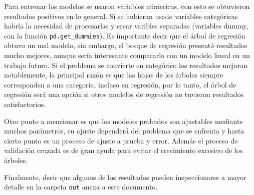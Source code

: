 \documentclass[11pt]{article}
\begin{document}
Para entrenar los modelos se usaron variables númericas, con esto se
obtuvieron resultados positivos en lo general. Si se hubieran usado
variables categóricas habría la necesidad de procesarlas y crear
varibles separadas (variables dummy, con la función
\texttt{pd.get\_dummies}). Es importante decir que el árbol de regresión
obtuvo un mal modelo, sin embargo, el bosque de regresión presentó
resultados mucho mejores, aunque sería interesante compararlo con un
modelo lineal en un trabajo futuro. Si el problema se convierte en
categórico los resultados mejoran notablemente, la principal razón es
que las hojas de los árboles siempre corresponden a una categoría,
incluso en regresión, por lo tanto, el árbol de regresión será una
opción si otros modelos de regresión no tuvieron resultados
satisfactorios.

Otro punto a mencionar es que los modelos probados son ajustables
mediante muchos parámetros, su ajuste dependerá del problema que se
enfrenta y hasta cierto punto es un proceso de ajuste a prueba y error.
Además el proceso de validación cruzada es de gran ayuda para evitar el
crecimiento excesivo de los árboles.

Finalmente, decir que algunos de los resultados pueden inspeccionarse a
mayor detalle en la carpeta \texttt{out} anexa a este documento.


    
    
    
\end{document}

